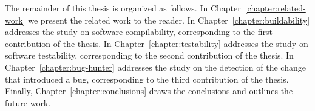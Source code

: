 The remainder of this thesis is organized as follows.
In Chapter~\ref{chapter:related-work} we present the related work to the reader. 
In Chapter~\ref{chapter:buildability} addresses the study on software compilability, corresponding to the first contribution of the thesis.
In Chapter~\ref{chapter:testability} addresses the study on software testability, corresponding to the second contribution of the thesis.
In Chapter~\ref{chapter:bug-hunter} addresses the study on the detection of the change that introduced a bug, corresponding to the third contribution of the thesis.
Finally, Chapter~\ref{chapter:conclusions} draws the conclusions and outlines the future work.
